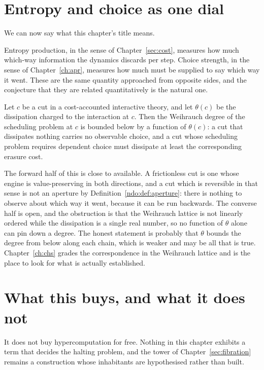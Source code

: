 \section{Entropy and choice as one dial}

We can now say what this chapter's title means.

Entropy production, in the sense of Chapter~\ref{sec:cost}, measures how
much which-way information the dynamics discards per step.
Choice strength, in the sense of Chapter~\ref{ch:apr}, measures how much
must be supplied to say which way it went.
These are the same quantity approached from opposite sides, and the
conjecture that they are related quantitatively is the natural one.

\begin{conjecture}
\label{conj:dissipation-choice}
Let $c$ be a cut in a cost-accounted interactive theory, and let
$\theta(c)$ be the dissipation charged to the interaction at $c$.
Then the Weihrauch degree of the scheduling problem at $c$ is bounded
below by a function of $\theta(c)$: a cut that dissipates nothing carries
no observable choice, and a cut whose scheduling problem requires
dependent choice must dissipate at least the corresponding erasure cost.
\end{conjecture}

The forward half of this is close to available.
A frictionless cut is one whose engine is value-preserving in both
directions, and a cut which is reversible in that sense is not an
aperture by Definition~\ref{ndo:def:aperture}: there is nothing to
observe about which way it went, because it can be run backwards.
The converse half is open, and the obstruction is that the Weihrauch
lattice is not linearly ordered while the dissipation is a single real
number, so no function of $\theta$ alone can pin down a degree.
The honest statement is probably that $\theta$ bounds the degree from
below along each chain, which is weaker and may be all that is true.
Chapter~\ref{ch:chs} grades the correspondence in the Weihrauch lattice
and is the place to look for what is actually established.

\section{What this buys, and what it does not}

It does not buy hypercomputation for free.
Nothing in this chapter exhibits a term that decides the halting problem,
and the tower of Chapter~\ref{sec:fibration} remains a construction whose
inhabitants are hypothesised rather than built.

